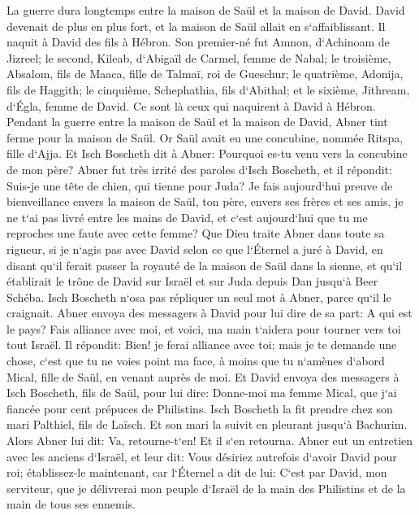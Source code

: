 \verse La guerre dura longtemps entre la maison de Saül et la maison de David. David devenait de plus en plus fort, et la maison de Saül allait en s`affaiblissant. 
\verse Il naquit à David des fils à Hébron. Son premier-né fut Amnon, d`Achinoam de Jizreel; 
\verse le second, Kileab, d`Abigaïl de Carmel, femme de Nabal; le troisième, Absalom, fils de Maaca, fille de Talmaï, roi de Gueschur; 
\verse le quatrième, Adonija, fils de Haggith; le cinquième, Schephathia, fils d`Abithal; 
\verse et le sixième, Jithream, d`Égla, femme de David. Ce sont là ceux qui naquirent à David à Hébron. 
\verse Pendant la guerre entre la maison de Saül et la maison de David, Abner tint ferme pour la maison de Saül. 
\verse Or Saül avait eu une concubine, nommée Ritspa, fille d`Ajja. Et Isch Boscheth dit à Abner: Pourquoi es-tu venu vers la concubine de mon père? 
\verse Abner fut très irrité des paroles d`Isch Boscheth, et il répondit: Suis-je une tête de chien, qui tienne pour Juda? Je fais aujourd`hui preuve de bienveillance envers la maison de Saül, ton père, envers ses frères et ses amis, je ne t`ai pas livré entre les mains de David, et c`est aujourd`hui que tu me reproches une faute avec cette femme? 
\verse Que Dieu traite Abner dans toute sa rigueur, si je n`agis pas avec David selon ce que l`Éternel a juré à David, 
\verse en disant qu`il ferait passer la royauté de la maison de Saül dans la sienne, et qu`il établirait le trône de David sur Israël et sur Juda depuis Dan jusqu`à Beer Schéba. 
\verse Isch Boscheth n`osa pas répliquer un seul mot à Abner, parce qu`il le craignait. 
\verse Abner envoya des messagers à David pour lui dire de sa part: A qui est le pays? Fais alliance avec moi, et voici, ma main t`aidera pour tourner vers toi tout Israël. 
\verse Il répondit: Bien! je ferai alliance avec toi; mais je te demande une chose, c`est que tu ne voies point ma face, à moins que tu n`amènes d`abord Mical, fille de Saül, en venant auprès de moi. 
\verse Et David envoya des messagers à Isch Boscheth, fils de Saül, pour lui dire: Donne-moi ma femme Mical, que j`ai fiancée pour cent prépuces de Philistins. 
\verse Isch Boscheth la fit prendre chez son mari Palthiel, fils de Laïsch. 
\verse Et son mari la suivit en pleurant jusqu`à Bachurim. Alors Abner lui dit: Va, retourne-t`en! Et il s`en retourna. 
\verse Abner eut un entretien avec les anciens d`Israël, et leur dit: Vous désiriez autrefois d`avoir David pour roi; 
\verse établissez-le maintenant, car l`Éternel a dit de lui: C`est par David, mon serviteur, que je délivrerai mon peuple d`Israël de la main des Philistins et de la main de tous ses ennemis. 
